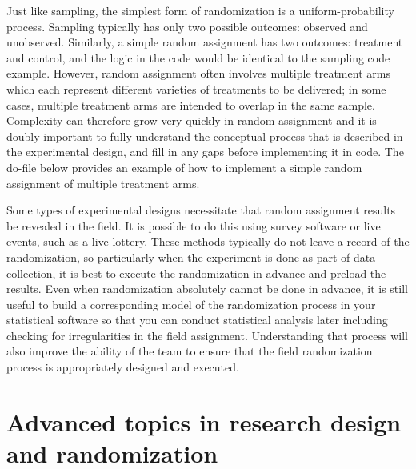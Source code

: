 Just like sampling, the simplest form of randomization
is a uniform-probability process.
Sampling typically has only two possible outcomes: observed and unobserved.
Similarly, a simple random assignment has two outcomes: treatment and control,
and the logic in the code would be identical to the sampling code example.
However, random assignment often involves multiple treatment arms
which each represent different varieties of treatments to be delivered;
in some cases, multiple treatment arms are intended to overlap in the same sample.
Complexity can therefore grow very quickly in random assignment
and it is doubly important to fully understand the conceptual process
that is described in the experimental design,
and fill in any gaps before implementing it in code.
The do-file below provides an example of how to implement
a simple random assignment of multiple treatment arms.


Some types of experimental designs necessitate
that random assignment results be revealed in the field.
It is possible to do this using survey software or live events, such as a live lottery.
These methods typically do not leave a record of the randomization,
so particularly when the experiment is done as part of data collection,
it is best to execute the randomization in advance and preload the results.
Even when randomization absolutely cannot be done in advance, it is still useful
to build a corresponding model of the randomization process in your statistical software
so that you can conduct statistical analysis later
including checking for irregularities in the field assignment.
Understanding that process will also improve the ability of the team
to ensure that the field randomization process is appropriately designed and executed.



\section{Advanced topics in research design and randomization}

